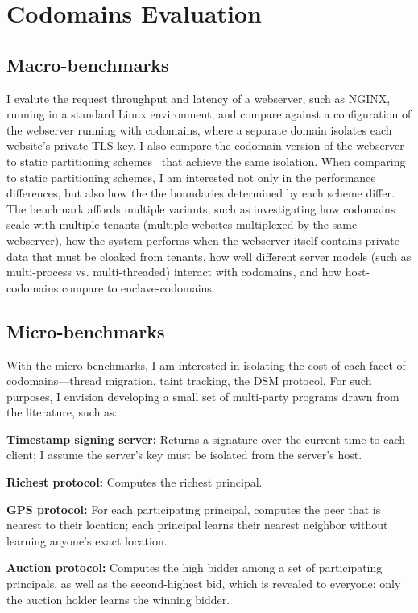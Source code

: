 \section{Codomains Evaluation}
\label{sec:codomains-eval}


\subsection{Macro-benchmarks}

%
I evalute the request throughput and latency of a webserver, such as NGINX,
running in a standard Linux environment, and compare against a configuration of
the webserver running with codomains, where a separate domain isolates each
website's private TLS key.
%
I also compare the codomain version of the webserver to 
static partitioning schemes~\cite{eleos,glamdring,privtrans} that achieve
the same isolation.
%
When comparing to static partitioning schemes, I am interested not only in the
performance differences, but also how the the boundaries determined by each
scheme differ.
%
The benchmark affords multiple variants, such as investigating how codomains
scale with multiple tenants (multiple websites multiplexed by the same
webserver), how the system performs when the webserver itself contains
private data that must be cloaked from tenants, how well different server
models (such as multi-process vs. multi-threaded) interact with codomains, and
how host-codomains compare to enclave-codomains.






\subsection{Micro-benchmarks}

With the micro-benchmarks, I am interested in isolating the cost of each
facet of codomains---thread migration, taint tracking, the DSM protocol.
%
For such purposes, I envision developing a small set of multi-party programs
drawn from the literature, such as:

\begin{widelist}
\item \textbf{Timestamp signing server:} Returns a signature over the current
time to each client; I assume the server's key must be isolated from the
server's host.
%
\item \textbf{Richest protocol:} Computes the richest principal.
%
\item \textbf{GPS protocol:} For each participating principal,
computes the peer that is nearest to their location; each principal learns
their nearest neighbor without learning anyone's exact location.
%
\item \textbf{Auction protocol:} Computes the high bidder among a set of
participating principals, as well as the second-highest bid, which is revealed
to everyone; only the auction holder learns the winning bidder.
\end{widelist}

